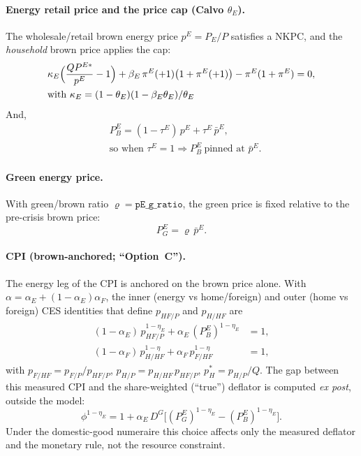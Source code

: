 \documentclass[11pt,a4paper]{article}
\newcommand{\DG}{D^{G}}
\newcommand{\PEB}{P^{E}_{B}}
\newcommand{\PEG}{P^{E}_{G}}
\newcommand{\pE}{p^{E}}
\begin{document}
\paragraph{Energy retail price and the price cap (Calvo $\theta_E$).} The
wholesale/retail brown energy price $\pE=P_E/P$ satisfies a NKPC, and the
\emph{household} brown price applies the cap:
\begin{align}
&\kappa_E\Bigl(\frac{Q P^{E*}}{\pE}-1\Bigr)
+\beta_E\,\pi^{E}(+1)\bigl(1+\pi^{E}(+1)\bigr)
-\pi^{E}(1+\pi^{E})=0,\\
 &\text{with } \kappa_E=(1-\theta_E)(1-\beta_E\theta_E)/\theta_E
\label{eq:cap}
\end{align}
And,
\begin{align}
&\PEB = (1-\tau^{E})\,\pE+\tau^{E}\,\bar\pE,\\
&\text{so when }\tau^{E}=1\Rightarrow \PEB\ \text{pinned at }\bar\pE .
\end{align}

\paragraph{Green energy price.} With green/brown ratio $\varrho=\texttt{pE\_g\_ratio}$,
the green price is fixed relative to the pre-crisis brown price:
\begin{equation}
\PEG=\varrho\,\bar\pE . \label{eq:pEG}
\end{equation}

\paragraph{CPI (brown-anchored; ``Option~C'').} The energy leg of the CPI is
anchored on the brown price alone. With $\alpha=\alpha_E+(1-\alpha_E)\alpha_F$,
the inner (energy vs home/foreign) and outer (home vs foreign) CES identities
that define $p_{HF/P}$ and $p_{H/HF}$ are
\begin{align}
(1-\alpha_E)\,p_{HF/P}^{1-\eta_E}+\alpha_E\,(\PEB)^{1-\eta_E}&=1, \label{eq:innernest}\\
(1-\alpha_F)\,p_{H/HF}^{1-\eta}+\alpha_F\,p_{F/HF}^{1-\eta}&=1, \label{eq:outernest}
\end{align}
with $p_{F/HF}=p_{F/P}/p_{HF/P}$, $p_{H/P}=p_{H/HF}\,p_{HF/P}$, $p_H^{*}=p_{H/P}/Q$.
The gap between this measured CPI and the share-weighted (``true'') deflator is
computed \emph{ex post}, outside the model:
\begin{equation}
\phi^{1-\eta_E}=1+\alpha_E\,\DG\bigl[(\PEG)^{1-\eta_E}-(\PEB)^{1-\eta_E}\bigr].
\end{equation}
Under the domestic-good numeraire this choice affects only the measured deflator
and the monetary rule, not the resource constraint.
\end{document}
